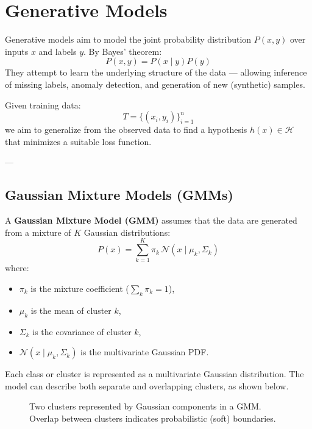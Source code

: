 \section{Generative Models}

Generative models aim to model the joint probability distribution \( P(x, y) \) over inputs \( x \) and labels \( y \).  
By Bayes' theorem:
\[
P(x, y) = P(x \mid y) P(y)
\]
They attempt to learn the underlying structure of the data — allowing inference of missing labels, anomaly detection, and generation of new (synthetic) samples.

Given training data:
\[
T = \{ (x_i, y_i) \}_{i=1}^{n}
\]
we aim to generalize from the observed data to find a hypothesis \( h(x) \in \mathcal{H} \) that minimizes a suitable loss function.

---

\subsection{Gaussian Mixture Models (GMMs)}

A \textbf{Gaussian Mixture Model (GMM)} assumes that the data are generated from a mixture of \( K \) Gaussian distributions:
\[
P(x) = \sum_{k=1}^{K} \pi_k \, \mathcal{N}(x \mid \mu_k, \Sigma_k)
\]
where:
\begin{itemize}
    \item \( \pi_k \) is the mixture coefficient (\( \sum_k \pi_k = 1 \)),
    \item \( \mu_k \) is the mean of cluster \( k \),
    \item \( \Sigma_k \) is the covariance of cluster \( k \),
    \item \( \mathcal{N}(x \mid \mu_k, \Sigma_k) \) is the multivariate Gaussian PDF.
\end{itemize}

Each class or cluster is represented as a multivariate Gaussian distribution.  
The model can describe both separate and overlapping clusters, as shown below.

\begin{figure}[h]
\centering
{}
\caption{Two clusters represented by Gaussian components in a GMM. Overlap between clusters indicates probabilistic (soft) boundaries.}
\end{figure}

